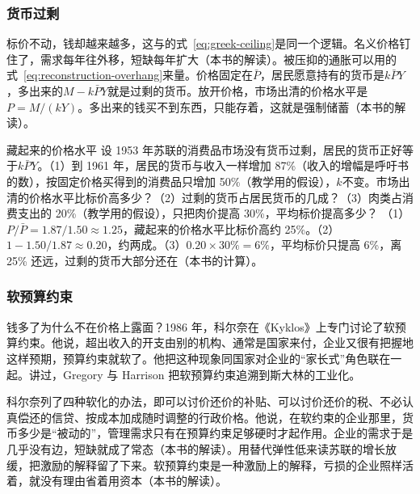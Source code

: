 \subsubsection{货币过剩}

标价不动，钱却越来越多，这与的式~\eqref{eq:greek-ceiling}是同一个逻辑。名义价格钉住了，需求每年往外移，短缺每年扩大（本书的解读）。被压抑的通胀可以用的式~\eqref{eq:reconstruction-overhang}来量。价格固定在$\bar P$，居民愿意持有的货币是$k\bar PY$，多出来的$M-k\bar PY$就是过剩的货币。放开价格，市场出清的价格水平是$P=M/(kY)$。多出来的钱买不到东西，只能存着，这就是强制储蓄（本书的解读）。

\begin{example}{藏起来的价格水平}\label{ex:planned-overhang}
设 1953 年苏联的消费品市场没有货币过剩，居民的货币正好等于$k\bar PY$。（1）到 1961 年，居民的货币与收入一样增加 87\%（收入的增幅是呼吁书的数），按固定价格买得到的消费品只增加 50\%（教学用的假设），$k$不变。市场出清的价格水平比标价高多少？（2）过剩的货币占居民货币的几成？（3）肉类占消费支出的 20\%（教学用的假设），只把肉价提高 30\%，平均标价提高多少？
\solution
（1）$P/\bar P=1.87/1.50\approx1.25$，藏起来的价格水平比标价高约 25\%。（2）$1-1.50/1.87\approx0.20$，约两成。（3）$0.20\times30\%=6\%$，平均标价只提高 6\%，离 25\% 还远，过剩的货币大部分还在（本书的计算）。
\end{example}

\subsubsection{软预算约束}

钱多了为什么不在价格上露面？1986 年，科尔奈在《Kyklos》上专门讨论了软预算约束\cite{kornai1986}。他说，超出收入的开支由别的机构、通常是国家来付，企业又很有把握地这样预期，预算约束就软了\cite{kornai1986}。他把这种现象同国家对企业的“家长式”角色联在一起\cite{kornai1986}。讲过，Gregory 与 Harrison 把软预算约束追溯到斯大林的工业化。

科尔奈列了四种软化的办法，即可以讨价还价的补贴、可以讨价还价的税、不必认真偿还的信贷、按成本加成随时调整的行政价格\cite{kornai1986}。他说，在软约束的企业那里，货币多少是“被动的”，管理需求只有在预算约束足够硬时才起作用\cite{kornai1986}。企业的需求于是几乎没有边，短缺就成了常态（本书的解读）。用替代弹性低来读苏联的增长放缓，把激励的解释留了下来。软预算约束是一种激励上的解释，亏损的企业照样活着，就没有理由省着用资本（本书的解读）。

